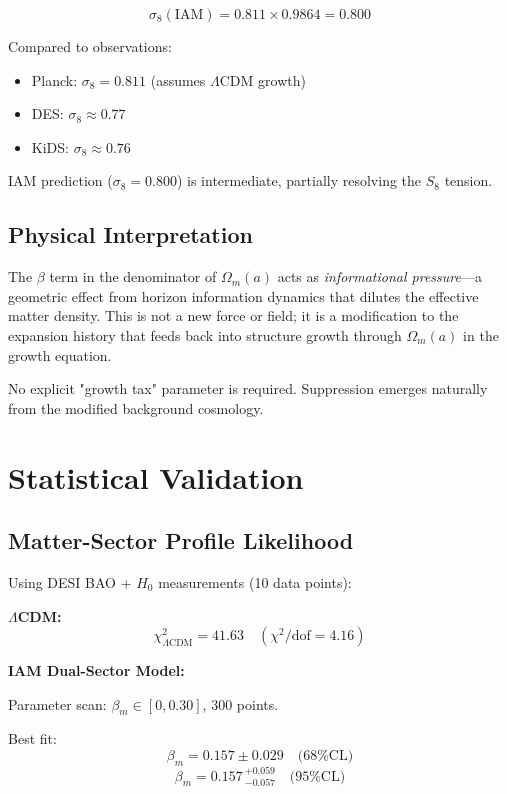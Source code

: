 \documentclass[twocolumn,superscriptaddress,prl,amsmath,amssymb]{revtex4-2}
\begin{document}
\begin{equation}
\sigma_8(\text{IAM}) = 0.811 \times 0.9864 = 0.800
\end{equation}

Compared to observations:
\begin{itemize}
\item Planck: $\sigma_8 = 0.811$ (assumes $\Lambda$CDM growth)
\item DES: $\sigma_8 \approx 0.77$~\cite{DES2022}
\item KiDS: $\sigma_8 \approx 0.76$~\cite{KiDS2020}
\end{itemize}

IAM prediction ($\sigma_8 = 0.800$) is intermediate, partially resolving the $S_8$ tension.

\subsection{Physical Interpretation}

The $\beta$ term in the denominator of $\Omega_m(a)$ acts as \textit{informational pressure}—a geometric effect from horizon information dynamics that dilutes the effective matter density. This is not a new force or field; it is a modification to the expansion history that feeds back into structure growth through $\Omega_m(a)$ in the growth equation.

No explicit "growth tax" parameter is required. Suppression emerges naturally from the modified background cosmology.

\section{Statistical Validation}

\subsection{Matter-Sector Profile Likelihood}

Using DESI BAO + $H_0$ measurements (10 data points):

\textbf{$\Lambda$CDM:}
\begin{equation}
\chi^2_{\Lambda\text{CDM}} = 41.63 \quad (\chi^2/\text{dof} = 4.16)
\end{equation}

\textbf{IAM Dual-Sector Model:}

Parameter scan: $\beta_m \in [0, 0.30]$, 300 points.

Best fit:
\begin{equation}
\beta_m = 0.157 \pm 0.029 \quad \text{(68\% CL)}
\end{equation}
\begin{equation}
\beta_m = 0.157\,^{+0.059}_{-0.057} \quad \text{(95\% CL)}
\end{equation}
\end{document}
